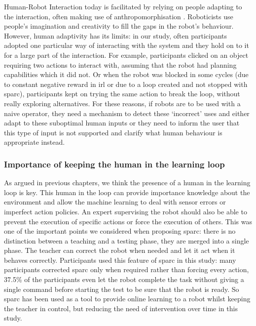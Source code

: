Human-Robot Interaction today is facilitated by relying on people adapting to the interaction, often making use of anthropomorphisation \citep{zlotowski2015anthropomorphism}. Roboticists use people's imagination and creativity to fill the gaps in the robot's behaviour. However, human adaptivity has its limits: in our study, often participants adopted one particular way of interacting with the system and they hold on to it for a large part of the interaction. For example, participants clicked on an object requiring two actions to interact with, assuming that the robot had planning capabilities which it did not. Or when the robot was blocked in some cycles (due to constant negative reward in \gls{irl} or due to a loop created and not stopped with \gls{sparc}), participants kept on trying the same action to break the loop, without really exploring alternatives. For these reasons, if robots are to be used with a naive operator, they need a mechanism to detect these `incorrect' uses and either adapt to these suboptimal human inputs or they need to inform the user that this type of input is not supported and clarify what human behaviour is appropriate instead.

\subsubsection{Importance of keeping the human in the learning loop}

As argued in previous chapters, we think the presence of a human in the learning loop is key. This human in the loop can provide importance knowledge about the environment and allow the machine learning to deal with sensor errors or imperfect action policies. An expert supervising the robot should also be able to prevent the execution of specific actions or force the execution of others. This was one of the important points we considered when proposing \gls{sparc}: there is no distinction between a teaching and a testing phase, they are merged into a single phase. The teacher can correct the robot when needed and let it act when it behaves correctly. Participants used this feature of \gls{sparc} in this study: many participants corrected \gls{sparc} only when required rather than forcing every action, 37.5\% of the participants even let the robot complete the task without giving a single command before starting the test to be sure that the robot is ready. So \gls{sparc} has been used as a tool to provide online learning to a robot whilst keeping the teacher in control, but reducing the need of intervention over time in this study.

